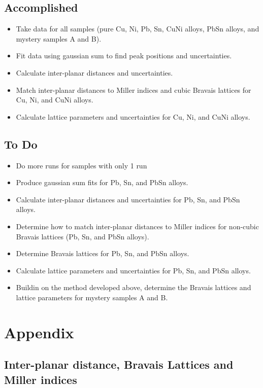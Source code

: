 \documentclass[12pt]{article}
\begin{document}
\subsection*{Accomplished}
\begin{itemize}
	\item Take data for all samples (pure Cu, Ni, Pb, Sn, CuNi alloys, PbSn alloys, and mystery samples A and B).
	\item Fit data using gaussian sum to find peak positions and uncertainties.
	\item Calculate inter-planar distances and uncertainties.
	\item Match inter-planar distances to Miller indices and cubic Bravais lattices for Cu, Ni, and CuNi alloys.
	\item Calculate lattice parameters and uncertainties for Cu, Ni, and CuNi alloys.
\end{itemize}

\subsection*{To Do}
\begin{itemize}
	\item Do more runs for samples with only 1 run
	\item Produce gaussian sum fits for Pb, Sn, and PbSn alloys.
	\item Calculate inter-planar distances and uncertainties for Pb, Sn, and PbSn alloys.
	\item Determine how to match inter-planar distances to Miller indices for non-cubic Bravais lattices (Pb, Sn, and PbSn alloys).
	\item Determine Bravais lattices for Pb, Sn, and PbSn alloys.
	\item Calculate lattice parameters and uncertainties for Pb, Sn, and PbSn alloys.
	\item Buildin on the method developed above, determine the Bravais lattices and lattice parameters for mystery samples A and B.
\end{itemize}






\section{Appendix}
\subsection{Inter-planar distance, Bravais Lattices and Miller indices}\label{A:brav_eq}
\end{document}
